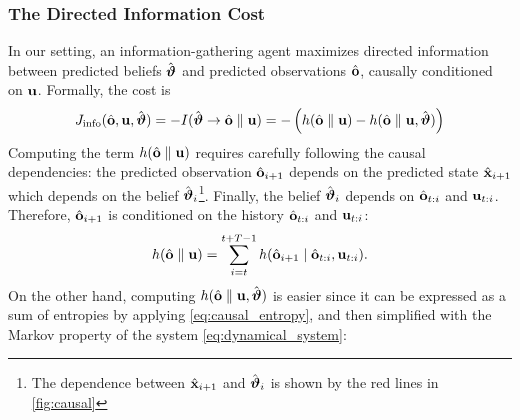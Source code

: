 \subsubsection{The Directed Information Cost}

In our setting, an information-gathering agent maximizes directed information between predicted beliefs $\hat{\boldsymbol{{\vartheta}}}$ and predicted observations $\hat{\mathbf{o}}$, causally conditioned on $\mathbf{u}$.
Formally, the cost is
\begin{equation}
    J_{\text{info}}(\hat{\mathbf{o}}, \mathbf{u}, \hat{\boldsymbol{{\vartheta}}}) = -I(\hat{\boldsymbol{{\vartheta}}} \rightarrow \hat{\mathbf{o}} \parallel \mathbf{u}) = -\left(h(\hat{\mathbf{o}} \parallel \mathbf{u})-h(\hat{\mathbf{o}} \parallel \mathbf{u},\hat{\boldsymbol{{\vartheta}}})\right)
    \label{eq:objective_directed_info}
\end{equation}
Computing the term $h(\hat{\mathbf{o}} \parallel \mathbf{u})$ requires carefully following the causal dependencies:
the predicted observation $\hat{\mathbf{o}}_{i+1}$ depends on the predicted state $\hat{\mathbf{x}}_{i+1}$ which depends on the belief $\hat{\boldsymbol{{\vartheta}}}_i$\footnote{The dependence between $\hat{\mathbf{x}}_{i+1}$ and $\hat{\boldsymbol{{\vartheta}}}_i$ is shown by the red lines in \cref{fig:causal}}. 
Finally, the belief $\hat{\boldsymbol{{\vartheta}}}_i$ depends on $\hat{\mathbf{o}}_{t:i}$ and $\mathbf{u}_{t:i}$.
Therefore, $\hat{\mathbf{o}}_{i+1}$ is conditioned on the history $\hat{\mathbf{o}}_{t:i}$ and $\mathbf{u}_{t:i}$:
\begin{equation}
    h(\hat{\mathbf{o}} \parallel \mathbf{u}) = \sum_{i=t}^{t+T-1} h(\hat{\mathbf{o}}_{i+1} \mid \hat{\mathbf{o}}_{t:i}, \mathbf{u}_{t:i}).
    \label{eq:obs_causal_entropy_marg}
\end{equation}
On the other hand, computing $h(\hat{\mathbf{o}} \parallel \mathbf{u}, \hat{\boldsymbol{{\vartheta}}})$ is easier since it can be expressed as a sum of entropies by applying \eqref{eq:causal_entropy}, and then simplified with the Markov property of the system \eqref{eq:dynamical_system}:
